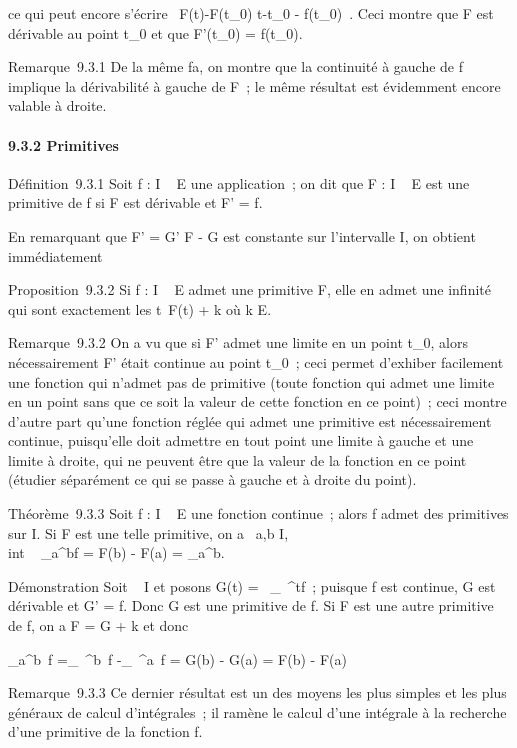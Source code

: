 \documentclass[]{article}
\begin{document}
ce qui peut encore s'écrire \
F(t)-F(t_0) \over t-t_0 -
f(t_0)\ \leq \epsilon. Ceci montre que F est
dérivable au point t_0 et que F'(t_0) =
f(t_0).

Remarque~9.3.1 De la même fa\ccon, on montre que la
continuité à gauche de f implique la dérivabilité à gauche de F~; le
même résultat est évidemment encore valable à droite.

\paragraph{9.3.2 Primitives}

Définition~9.3.1 Soit f : I \rightarrow~ E une application~; on dit que F : I \rightarrow~ E
est une primitive de f si F est dérivable et F' = f.

En remarquant que F' = G' \Leftrightarrow F - G est
constante sur l'intervalle I, on obtient immédiatement

Proposition~9.3.2 Si f : I \rightarrow~ E admet une primitive F, elle en admet une
infinité qui sont exactement les t\mapsto~F(t) + k
où k \in E.

Remarque~9.3.2 On a vu que si F' admet une limite en un point
t_0, alors nécessairement F' était continue au point
t_0~; ceci permet d'exhiber facilement une fonction qui n'admet
pas de primitive (toute fonction qui admet une limite en un point sans
que ce soit la valeur de cette fonction en ce point)~; ceci montre
d'autre part qu'une fonction réglée qui admet une primitive est
nécessairement continue, puisqu'elle doit admettre en tout point une
limite à gauche et une limite à droite, qui ne peuvent être que la
valeur de la fonction en ce point (étudier séparément ce qui se passe à
gauche et à droite du point).

Théorème~9.3.3 Soit f : I \rightarrow~ E une fonction continue~; alors f admet des
primitives sur I. Si F est une telle primitive, on a
\forall~a,b \in I, \\int ~
_a^bf = F(b) - F(a) = \left
[F(t)\right ]_a^b.

Démonstration Soit \alpha~ \in I et posons G(t) =\int ~
_\alpha~^tf~; puisque f est continue, G est dérivable et G' = f.
Donc G est une primitive de f. Si F est une autre primitive de f, on a F
= G + k et donc

\int  _a^b~f
=\int  _\alpha~^b~f
-\int  _\alpha~^a~f = G(b) - G(a) = F(b)
- F(a)

Remarque~9.3.3 Ce dernier résultat est un des moyens les plus simples et
les plus généraux de calcul d'intégrales~; il ramène le calcul d'une
intégrale à la recherche d'une primitive de la fonction f.
\end{document}
